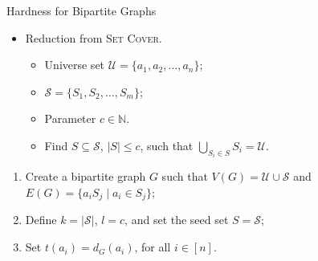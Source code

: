 \documentclass[10pt,aspectratio=169,english]{beamer}
\begin{document}
\begin{frame}{Hardness for Bipartite Graphs}
	\begin{itemize}
		\item Reduction from \textsc{Set Cover}.
		\begin{itemize}
			\item Universe set $\mathcal{U} = \{a_1, a_2, \dots, a_n\}$;
			\item $\mathcal{S} = \{S_1, S_2, \dots, S_m\}$;
			\item Parameter $c \in \mathbb{N}$.
			\item Find $S \subseteq \mathcal{S}$, $|S| \leq c$, such that $\bigcup_{S_i \in S}S_i = \mathcal{U}$.
		\end{itemize}
	\end{itemize}
	\begin{enumerate}
		\item Create a bipartite graph $G$ such that $V(G) = \mathcal{U} \cup \mathcal{S}$ and $E(G) = \{a_iS_j \mid a_i \in S_j\}$;
		\item Define $k = |\mathcal{S}|$, $l = c$, and set the seed set $S = \mathcal{S}$;
		\item Set $t(a_i) = d_G(a_i)$, for all $i \in [n]$.
	\end{enumerate}
\end{frame}
\end{document}
